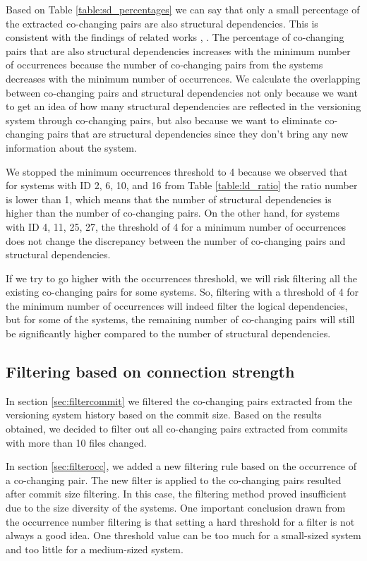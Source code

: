 Based on Table \ref{table:sd_percentages} we can say that only a small percentage of the extracted co-changing pairs are also structural dependencies. This is consistent with the findings of related works \cite{DBLP:journals/jss/AjienkaC17}, \cite{DBLP:journals/ese/AjienkaCC18}. 
The percentage of co-changing pairs that are also structural dependencies increases with the minimum number of occurrences because the number of co-changing pairs from the systems decreases with the minimum number of occurrences. 
We calculate the overlapping between co-changing pairs and structural dependencies not only because we want to get an idea of how many structural dependencies are reflected in the versioning system through co-changing pairs, but also because we want to eliminate co-changing pairs that are structural dependencies since they don't bring any new information about the system.

We stopped the minimum occurrences threshold to 4 because we observed that for systems with ID 2, 6, 10, and 16 from Table \ref{table:ld_ratio} the ratio number is lower than 1, which means that the number of structural dependencies is higher than the number of co-changing pairs. On the other hand, for systems with ID 4, 11, 25, 27, the threshold of 4 for a minimum number of occurrences does not change the discrepancy between the number of co-changing pairs and structural dependencies.

If we try to go higher with the occurrences threshold, we will risk filtering all the existing co-changing pairs for some systems.
So, filtering with a threshold of 4 for the minimum number of occurrences will indeed filter the logical dependencies, but for some of the systems, the remaining number of co-changing pairs will still be significantly higher compared to the number of structural dependencies.




\subsection{Filtering based on connection strength}
\label{sec:filterstrength}

In section \ref{sec:filtercommit} we filtered the co-changing pairs extracted from the versioning system history based on the commit size. Based on the results obtained, we decided to filter out all co-changing pairs extracted from commits with more than 10 files changed. 

In section \ref{sec:filterocc}, we added a new filtering rule based on the occurrence of a co-changing pair. The new filter is applied to the co-changing pairs resulted after commit size filtering. In this case, the filtering method proved insufficient due to the size diversity of the systems. One important conclusion drawn from the occurrence number filtering is that setting a hard threshold for a filter is not always a good idea. One threshold value can be too much for a small-sized system and too little for a medium-sized system. 

